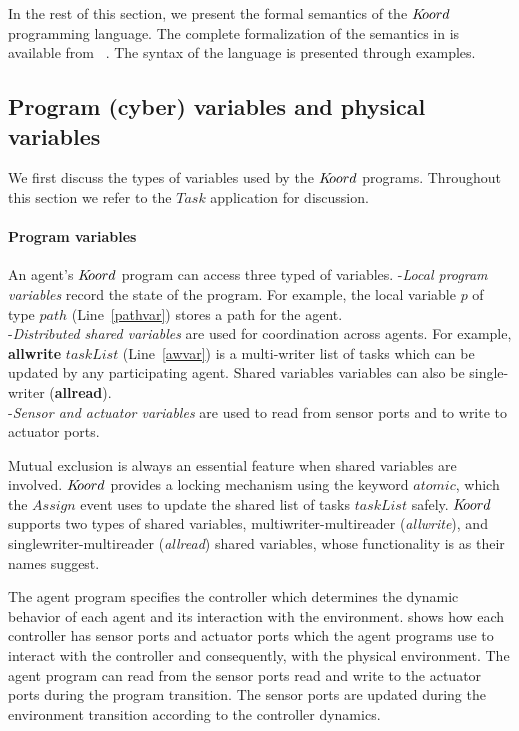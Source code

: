  In the rest of this section, we present the formal semantics of the $K\kern-2pt oord$ programming language. The complete formalization of the semantics in \K is available from~\cite{} . The syntax of the language is presented through examples. 
 
\subsection{Program (cyber) variables and physical variables}


We first discuss the types of variables used by the $K\kern-2pt oord$ programs. Throughout this section we refer to the $\mathit{Task}$ application for discussion.

\paragraph{Program variables}
An agent's $K\kern-2pt oord$ program can access three typed of variables. 
%
-{\em Local program variables\/} record the state of the program. For example, the local variable $p$ of type $\mathit{path}$ (Line~\ref{pathvar}) stores a path for the agent. \\

-{\em Distributed shared variables\/} are used for coordination across agents.  For example, {\bf allwrite} $\mathit{taskList}$ (Line~\ref{awvar}) is a multi-writer list of tasks which can be updated by any participating agent. Shared variables variables can also be single-writer ({\bf allread}). \\ 

-{\em Sensor and actuator variables\/} are used to read from sensor ports and to write to actuator ports. 

Mutual exclusion is always an essential feature when shared variables are involved. $K\kern-2pt oord$ provides a locking mechanism using the keyword $\mathit{atomic}$, which the $\mathit{Assign}$ event uses to update the shared list of tasks $\mathit{taskList}$ safely. $K\kern-2pt oord$ supports two types of shared variables, multiwriter-multireader (\emph{allwrite}), and singlewriter-multireader (\emph{allread}) shared variables, whose functionality is as their names suggest. 
 

The agent program specifies the controller which determines the dynamic behavior of each agent and its interaction with the environment.  shows how  each controller has sensor ports and actuator ports which the agent programs use to interact with the controller and consequently, with the physical environment. The agent program can read from the sensor ports read and write to the actuator ports during the program transition. The sensor ports are updated during the environment transition according to the controller dynamics. 

